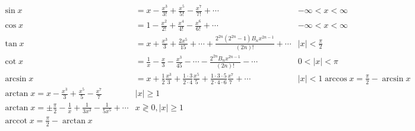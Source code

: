 \begin{equation}
\begin{aligned}
    \sin x & =x-\frac{x^3}{3!}+\frac{x^5}{5!}-\frac{x^7}{7!}+\cdots & -\infty<x<\infty \\
    \cos x & =1-\frac{x^2}{2!}+\frac{x^4}{4!}-\frac{x^6}{6!}+\cdots & -\infty<x<\infty \\
    \tan x & =x+\frac{x^3}{3}+\frac{2 x^5}{15}+\cdots+\frac{2^{2 n}\left(2^{2 n}-1\right) B_n x^{2 n-1}}{(2 n)!}+\cdots & |x|<\frac{\pi}{2} \\
    \cot x & =\frac{1}{x}-\frac{x}{3}-\frac{x^3}{45}-\cdots-\frac{2^{2 n} B_n x^{2 n-1}}{(2 n)!}-\cdots & 0<|x|<\pi \\
    \arcsin x & =x+\frac{1}{2} \frac{x^3}{3}+\frac{1 \cdot 3}{2 \cdot 4} \frac{x^5}{5}+\frac{1 \cdot 3 \cdot 5}{2 \cdot 4 \cdot 6} \frac{x^7}{7}+\cdots & |x|<1
    \arccos x=\frac{\pi}{2}-\arcsin x & \\
    \arctan x=x-\frac{x^3}{3}+\frac{x^5}{5}-\frac{x^7}{7} & |x| \geq 1 \\
    \arctan x= \pm \frac{\pi}{2}-\frac{1}{x}+\frac{1}{3 x^3}-\frac{1}{5 x^5}+\cdots & x \gtrless 0,|x| \geq 1 \\
    \operatorname{arccot} x=\frac{\pi}{2}-\arctan x &   
\end{aligned}
\end{equation}
